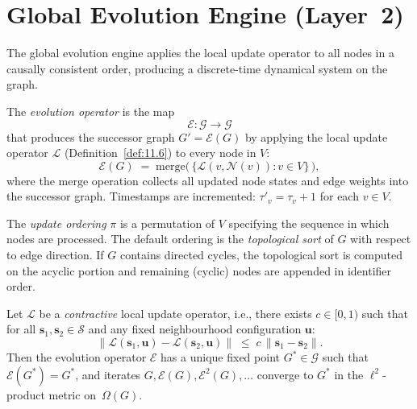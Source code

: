 \section{Global Evolution Engine (Layer~2)}
\label{sec:ch11:evolution}

The global evolution engine applies the local update operator to all
nodes in a causally consistent order, producing a discrete-time
dynamical system on the graph.

\begin{definition}
\label{def:11.14}
The \emph{evolution operator} is the map
\[
  \mathcal{E} \colon \mathcal{G} \to \mathcal{G}
\]
that produces the successor graph $G' = \mathcal{E}(G)$ by applying
the local update operator $\mathcal{L}$ (Definition~\ref{def:11.6})
to every node in $V$:
\begin{equation}
\label{eq:11.evolution}
  \mathcal{E}(G) \;=\;
  \mathrm{merge}\!\bigl(\,
    \{\mathcal{L}(v, \mathcal{N}(v)) : v \in V\}
  \,\bigr),
\end{equation}
where the $\mathrm{merge}$ operation collects all updated node states
and edge weights into the successor graph.  Timestamps are incremented:
$\tau'_v = \tau_v + 1$ for each $v \in V$.
\end{definition}

\begin{definition}
\label{def:11.15}
The \emph{update ordering} $\pi$ is a permutation of $V$ specifying
the sequence in which nodes are processed.  The default ordering is
the \emph{topological sort} of $G$ with respect to edge direction.
If $G$ contains directed cycles, the topological sort is computed on
the acyclic portion and remaining (cyclic) nodes are appended in
identifier order.
\end{definition}

\begin{theorem}
\label{thm:11.2}
Let $\mathcal{L}$ be a \emph{contractive} local update operator, i.e.,
there exists $c \in [0,1)$ such that for all
$\mathbf{s}_1, \mathbf{s}_2 \in \mathcal{S}$ and any fixed
neighbourhood configuration $\mathbf{u}$:
\[
  \bigl\|\mathcal{L}(\mathbf{s}_1, \mathbf{u}) -
         \mathcal{L}(\mathbf{s}_2, \mathbf{u})\bigr\|
  \;\leq\;
  c\,\bigl\|\mathbf{s}_1 - \mathbf{s}_2\bigr\|.
\]
Then the evolution operator $\mathcal{E}$ has a unique fixed point
$G^* \in \mathcal{G}$ such that $\mathcal{E}(G^*) = G^*$, and
iterates $G, \mathcal{E}(G), \mathcal{E}^2(G), \ldots$ converge to
$G^*$ in the $\ell^2$-product metric on~$\Omega(G)$.
\end{theorem}

